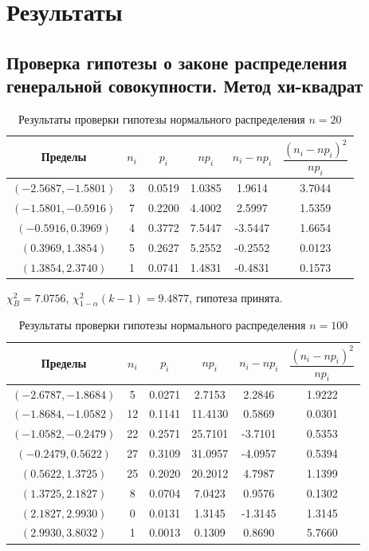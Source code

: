 \documentclass[12pt,a4paper]{article}
\begin{document}
	\section{Результаты}

	\subsection{Проверка гипотезы о законе распределения генеральной
		совокупности. Метод хи-квадрат}

	\begin{table}[htbp]
		\centering
		\begin{tabular}{ |c|c|c|c|c|c| }
			\hline
			Пределы & \( n_i \) & \( p_i \) & \( np_i \) & \( n_i - np_i \)
			& \( \dfrac{(n_i - np_i)^2}{np_i} \) \\
			\hline
			\( (-2.5687, -1.5801) \) & 3 & 0.0519 & 1.0385 & 1.9614 & 3.7044 \\
			\hline
			\( (-1.5801, -0.5916) \) & 7 & 0.2200 & 4.4002 & 2.5997 & 1.5359 \\
			\hline
			\( (-0.5916, 0.3969) \) & 4 & 0.3772 & 7.5447 & -3.5447 & 1.6654 \\
			\hline
			\( (0.3969, 1.3854) \) & 5 & 0.2627 & 5.2552 & -0.2552 & 0.0123 \\
			\hline
			\( (1.3854, 2.3740) \) & 1 & 0.0741 & 1.4831 & -0.4831 & 0.1573 \\
			\hline
		\end{tabular}
		\caption{Результаты проверки гипотезы нормального распределения
			\( n = 20 \)}
	\end{table}

	\( \chi_B^2 = 7.0756 \), \( \chi_{1 - \alpha}^2 (k - 1) = 9.4877 \),
	гипотеза принята.

	\begin{table}[htbp]
		\centering
		\begin{tabular}{ |c|c|c|c|c|c| }
			\hline
			Пределы & \( n_i \) & \( p_i \) & \( np_i \) & \( n_i - np_i \)
			& \( \dfrac{(n_i - np_i)^2}{np_i} \) \\
			\hline
			\( (-2.6787, -1.8684) \) & 5 & 0.0271 & 2.7153 & 2.2846 & 1.9222 \\
			\hline
			\( (-1.8684, -1.0582) \) & 12 & 0.1141 & 11.4130 & 0.5869 & 0.0301 \\
			\hline
			\( (-1.0582, -0.2479) \) & 22 & 0.2571 & 25.7101 & -3.7101 & 0.5353 \\
			\hline
			\( (-0.2479, 0.5622) \) & 27 & 0.3109 & 31.0957 & -4.0957 & 0.5394 \\
			\hline
			\( (0.5622, 1.3725) \) & 25 & 0.2020 & 20.2012 & 4.7987 & 1.1399 \\
			\hline
			\( (1.3725, 2.1827) \) & 8 & 0.0704 & 7.0423 & 0.9576 & 0.1302 \\
			\hline
			\( (2.1827, 2.9930) \) & 0 & 0.0131 & 1.3145 & -1.3145 & 1.3145 \\
			\hline
			\( (2.9930, 3.8032) \) & 1 & 0.0013 & 0.1309 & 0.8690 & 5.7660 \\
			\hline
		\end{tabular}
		\caption{Результаты проверки гипотезы нормального распределения
			\( n = 100 \)}
	\end{table}
\end{document}
